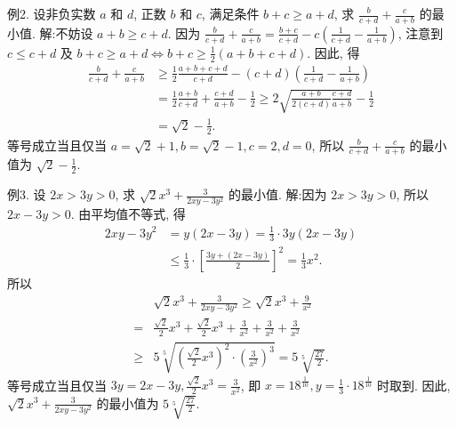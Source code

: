 例2. 设非负实数 $a$ 和 $d$, 正数 $b$ 和 $c$, 满足条件 $b+c \geqslant a+d$, 求 $\frac{b}{c+d}+ \frac{c}{a+b}$ 的最小值.
解:不妨设 $a+b \geqslant c+d$. 因为 $\frac{b}{c+d}+\frac{c}{a+b}=\frac{b+c}{c+d}- c\left(\frac{1}{c+d}-\frac{1}{a+b}\right)$, 注意到 $c \leqslant c+d$ 及 $b+c \geqslant a+d \Leftrightarrow b+c \geqslant \frac{1}{2}(a+b+ c+d)$. 因此, 得
$$
\begin{aligned}
\frac{b}{c+d}+\frac{c}{a+b} & \geqslant \frac{1}{2} \frac{a+b+c+d}{c+d}-(c+d)\left(\frac{1}{c+d}-\frac{1}{a+b}\right) \\
& =\frac{1}{2} \frac{a+b}{c+d}+\frac{c+d}{a+b}-\frac{1}{2} \geqslant 2 \sqrt{\frac{a+b}{2(c+d)} \frac{c+d}{a+b}}-\frac{1}{2} \\
& =\sqrt{2}-\frac{1}{2} .
\end{aligned}
$$
等号成立当且仅当 $a=\sqrt{2}+1, b=\sqrt{2}-1, c=2, d=0$, 所以 $\frac{b}{c+d}+ \frac{c}{a+b}$ 的最小值为 $\sqrt{2}-\frac{1}{2}$.



例3. 设 $2 x>3 y>0$, 求 $\sqrt{2} x^3+\frac{3}{2 x y-3 y^2}$ 的最小值.
解:因为 $2 x>3 y>0$, 所以 $2 x-3 y>0$. 由平均值不等式, 得
$$
\begin{aligned}
2 x y-3 y^2 & =y(2 x-3 y)=\frac{1}{3} \cdot 3 y(2 x-3 y) \\
& \leqslant \frac{1}{3} \cdot\left[\frac{3 y+(2 x-3 y)}{2}\right]^2=\frac{1}{3} x^2 .
\end{aligned}
$$
所以
$$
\begin{aligned}
& \sqrt{2} x^3+\frac{3}{2 x y-3 y^2} \geqslant \sqrt{2} x^3+\frac{9}{x^2} \\
= & \frac{\sqrt{2}}{2} x^3+\frac{\sqrt{2}}{2} x^3+\frac{3}{x^2}+\frac{3}{x^2}+\frac{3}{x^2} \\
\geqslant & 5 \sqrt[5]{\left(\frac{\sqrt{2}}{2} x^3\right)^2 \cdot\left(\frac{3}{x^2}\right)^3}=5 \sqrt[5]{\frac{27}{2}} .
\end{aligned}
$$
等号成立当且仅当 $3 y=2 x-3 y, \frac{\sqrt{2}}{2} x^3=\frac{3}{x^2}$, 即 $x=18^{\frac{1}{10}}, y=\frac{1}{3} \cdot 18^{\frac{1}{10}}$ 时取到.
因此, $\sqrt{2} x^3+\frac{3}{2 x y-3 y^2}$ 的最小值为 $5 \sqrt[5]{\frac{27}{2}}$.



